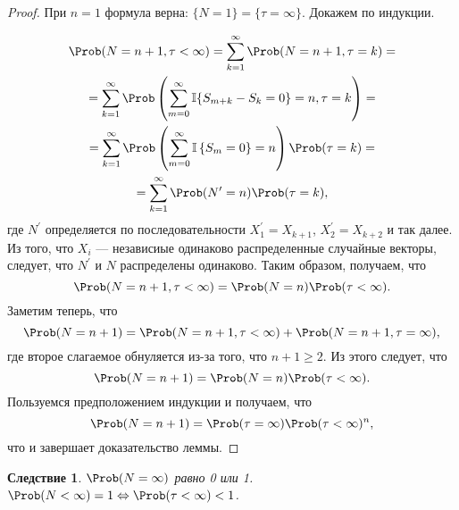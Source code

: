 \documentclass[a4paper]{article}
\newcommand{\ind}{\mathbb I}
\theoremstyle{plain}
\newtheorem*{cor}{Следствие}
\theoremstyle{definition}
\theoremstyle{remark}
\theoremstyle{nonumberplain}
\newtheorem{proof}{Доказательство}
\theoremstyle{nonumberplain}
\begin{document}
\begin{proof}
  При $n = 1$ формула верна: $\lbrace N = 1 \rbrace = \lbrace \tau = \infty \rbrace$. Докажем по индукции.

  \begin{multline*}
    \Prob(N = n+1, \tau < \infty) = \sum_{k=1}^{\infty} \Prob(N = n+1, \tau = k) =\\
    = \sum_{k=1}^{\infty} \Prob\left( \sum_{m=0}^{\infty} \ind \lbrace S_{m+k} - S_{k} = 0 \rbrace = n, \tau = k\right) =\\
    = \sum_{k=1}^{\infty} \Prob\left( \sum_{m=0}^{\infty} \ind \left\lbrace S_{m} = 0 \right\rbrace = n\right)\Prob(\tau = k) =\\
    = \sum_{k=1}^{\infty} \Prob(N^{\prime} = n)\Prob(\tau = k),
  \end{multline*}
  где $N^{\prime}$ определяется по последовательности $X_{1}^{\prime} = X_{k+1}$, $X_{2}^{\prime} = X_{k+2}$ и так далее. Из того, что $X_{i}$ --- независиые одинаково распределенные случайные векторы, следует, что $N^{\prime}$ и $N$ распределены одинаково. Таким образом, получаем, что
  \begin{equation*}
    \Prob(N = n+1, \tau < \infty) = \Prob(N = n)\Prob(\tau < \infty).
  \end{equation*}
  Заметим теперь, что
  \begin{equation*}
    \Prob(N = n+1) = \Prob(N = n+1, \tau < \infty) + \Prob(N = n+1, \tau = \infty),
  \end{equation*}
  где второе слагаемое обнуляется из-за того, что $n+1 \geqslant 2$. Из этого следует, что
  \begin{equation*}
    \Prob(N = n+1) = \Prob(N = n)\Prob(\tau < \infty).
  \end{equation*}
  Пользуемся предположением индукции и получаем, что
  \begin{equation*}
    \Prob(N = n+1) = \Prob(\tau = \infty)\Prob(\tau < \infty)^{n},
  \end{equation*}
  что и завершает доказательство леммы.
\end{proof}

\begin{cor}
  $\Prob(N = \infty)$ равно 0 или 1. $\Prob(N < \infty) = 1 \Leftrightarrow \Prob(\tau < \infty) < 1$.
\end{cor}
\end{document}
